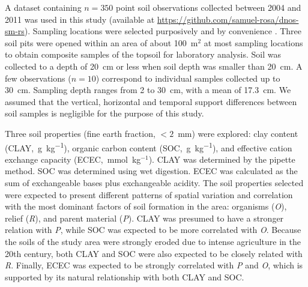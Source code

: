 A dataset containing $n=350$ point soil observations collected between 2004 and 2011 \cite{PedronEtAl2006b, 
SamuelRosaEtAl2011a, MiguelEtAl2012, Samuel-RosaEtAl2013} was used in this study (available at 
\url{https://github.com/samuel-rosa/dnos-sm-rs}). Sampling locations were selected purposively and by 
convenience \cite{Samuel-RosaEtAl2014b}. Three soil pits were opened within an area of about 100~m$^2$ at most 
sampling locations to obtain composite samples of the topsoil for laboratory analysis. Soil was collected to a 
depth of 20~cm or less when soil depth was smaller than 20~cm. A few observations ($n = 10$) correspond to 
individual samples collected up to 30~cm. Sampling depth ranges from 2 to 30~cm, with a mean of 17.3~cm. We 
assumed that the vertical, horizontal and temporal support differences between soil samples is negligible for 
the purpose of this study.

Three soil properties (fine earth fraction, $<2$~mm) were explored: clay content 
(CLAY,~\si{\gram\per\kilo\gram}), organic carbon content (SOC,~\si{\gram\per\kilo\gram}), and effective cation 
exchange capacity (ECEC,~mmol~kg$^{-1}$). CLAY was determined by the pipette method. SOC was determined using 
wet digestion. ECEC was calculated as the sum of exchangeable bases plus exchangeable acidity. The soil 
properties selected were expected to present different patterns of spatial variation and correlation with the 
most dominant factors of soil formation \cite{Jenny1941} in the area: organisms (\textit{O}), relief 
(\textit{R}), and parent material (\textit{P}). CLAY was presumed to have a stronger relation with \textit{P}, 
while SOC was expected to be more correlated with \textit{O}. Because the soils of the study area were strongly 
eroded due to intense agriculture in the 20th century, both CLAY and SOC were also expected to be closely 
related with \textit{R}. Finally, ECEC was expected to be strongly correlated with \textit{P} and \textit{O}, 
which is supported by its natural relationship with both CLAY and SOC.

